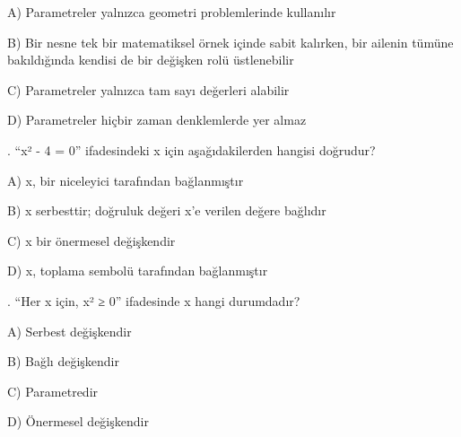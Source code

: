 \par\noindent\hspace*{1.6em}A) Parametreler yalnızca geometri problemlerinde kullanılır

\par\noindent\hspace*{1.6em}B) Bir nesne tek bir matematiksel örnek içinde sabit kalırken, bir ailenin tümüne bakıldığında kendisi de bir değişken rolü üstlenebilir

\par\noindent\hspace*{1.6em}C) Parametreler yalnızca tam sayı değerleri alabilir

\par\noindent\hspace*{1.6em}D) Parametreler hiçbir zaman denklemlerde yer almaz

\par\smallskip{}. “x² - 4 = 0” ifadesindeki x için aşağıdakilerden hangisi doğrudur?

\par\noindent\hspace*{1.6em}A) x, bir niceleyici tarafından bağlanmıştır

\par\noindent\hspace*{1.6em}B) x serbesttir; doğruluk değeri x’e verilen değere bağlıdır

\par\noindent\hspace*{1.6em}C) x bir önermesel değişkendir

\par\noindent\hspace*{1.6em}D) x, toplama sembolü tarafından bağlanmıştır

\par\smallskip{}. “Her x için, x² ≥ 0” ifadesinde x hangi durumdadır?

\par\noindent\hspace*{1.6em}A) Serbest değişkendir

\par\noindent\hspace*{1.6em}B) Bağlı değişkendir

\par\noindent\hspace*{1.6em}C) Parametredir

\par\noindent\hspace*{1.6em}D) Önermesel değişkendir

